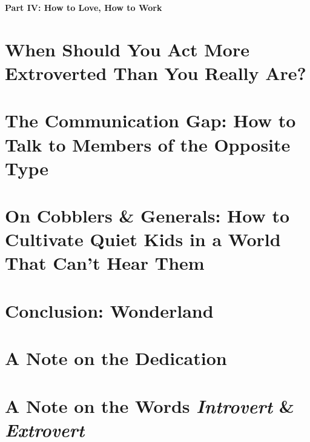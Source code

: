 \documentclass{article}
\numberwithin{equation}{section}
\begin{document}
\begin{center}\LARGE\sf
	\textbf{Part IV: How to Love, How to Work}
\end{center}

\section{When Should You Act More Extroverted Than You Really Are?}


\section{The Communication Gap: How to Talk to Members of the Opposite Type}


\section{On Cobblers \& Generals: How to Cultivate Quiet Kids in a World That Can't Hear Them}


\section{Conclusion: Wonderland}


\section{A Note on the Dedication}


\section{A Note on the Words \textit{Introvert} \& \textit{Extrovert}}


\printbibliography[heading=bibintoc]
	
\end{document}
